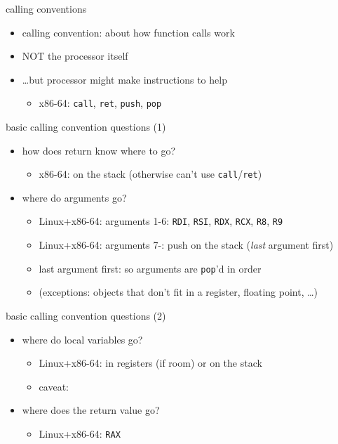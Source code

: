 \begin{frame}{calling conventions}
\begin{itemize}
\item calling convention:  about how function calls work
\item {} NOT the processor itself
\item \ldots but processor might make instructions to help
    \begin{itemize}
    \item x86-64: \texttt{call}, \texttt{ret}, \texttt{push}, \texttt{pop}
    \end{itemize}
\end{itemize}
\end{frame}

\begin{frame}{basic calling convention questions (1)}
\begin{itemize}
\item how does return know where to go?
    \begin{itemize}
    \item<2-> x86-64: on the stack (otherwise can't use \texttt{call}/\texttt{ret})
    \end{itemize}
\item where do arguments go?
    \begin{itemize}
    \item<3-> Linux+x86-64: arguments 1-6: \texttt{RDI}, \texttt{RSI}, \texttt{RDX}, \texttt{RCX}, \texttt{R8}, \texttt{R9}
    \item<3-> Linux+x86-64: arguments 7-: push on the stack (\textit{last} argument first)
    \item<3-> last argument first: so arguments are \texttt{pop}'d in order
    \item<3-> (exceptions: objects that don't fit in a register, floating point, \ldots)
    \end{itemize}
\end{itemize}
\end{frame}

\begin{frame}{basic calling convention questions (2)}
\begin{itemize}
\item where do local variables go?
    \begin{itemize}
    \item<2-> Linux+x86-64: in registers (if room) or on the stack
    \item<2-> caveat: 
    \end{itemize}
\item where does the return value go?
    \begin{itemize}
    \item<3-> Linux+x86-64: \texttt{RAX}
    \end{itemize}
\end{itemize}
\end{frame}

